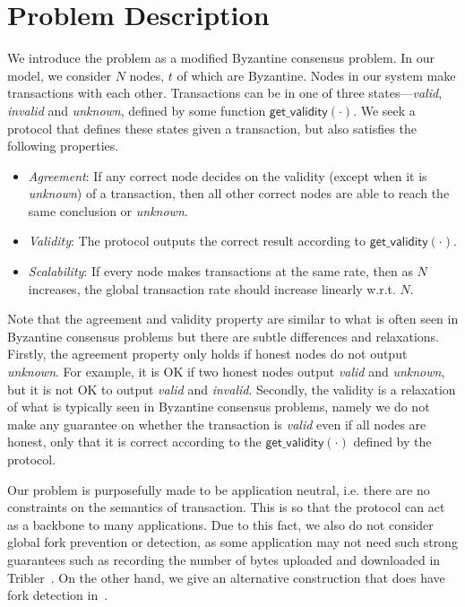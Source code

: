 \section{Problem Description}
\label{sec:description}
We introduce the problem as a modified Byzantine consensus problem.
In our model, we consider $N$ nodes, $t$ of which are Byzantine.
Nodes in our system make transactions with each other.
Transactions can be in one of three states---\emph{valid}, \emph{invalid} and \emph{unknown}, defined by some function $\textsf{get\_validity}(\cdot)$.
We seek a protocol that defines these states given a transaction,
but also satisfies the following properties.
\begin{itemize}
    \item \emph{Agreement}:
        If any correct node decides on the validity (except when it is \emph{unknown}) of a transaction,
        then all other correct nodes are able to reach the same conclusion or \emph{unknown}.
    \item \emph{Validity}:
        The protocol outputs the correct result according to $\textsf{get\_validity}(\cdot).$
    \item \emph{Scalability}:
        If every node makes transactions at the same rate,
        then as $N$ increases,
        the global transaction rate should increase linearly w.r.t. $N$.
\end{itemize}

Note that the agreement and validity property are similar to what is often seen in Byzantine consensus problems but there are subtle differences and relaxations.
Firstly, the agreement property only holds if honest nodes do not output \emph{unknown}.
For example, it is OK if two honest nodes output \emph{valid} and \emph{unknown}, but it is not OK to output \emph{valid} and \emph{invalid}.
Secondly, the validity is a relaxation of what is typically seen in Byzantine consensus problems,
namely we do not make any guarantee on whether the transaction is \emph{valid} even if all nodes are honest,
only that it is correct according to the $\textsf{get\_validity}(\cdot)$ defined by the protocol.

Our problem is purposefully made to be application neutral,
i.e. there are no constraints on the semantics of transaction.
This is so that the protocol can act as a backbone to many applications.
Due to this fact, we also do not consider global fork prevention or detection,
as some application may not need such strong guarantees such as recording the number of bytes uploaded and downloaded in Tribler~\cite{pimotte, pouwelse2008tribler}.
On the other hand, we give an alternative construction that does have fork detection in~.

